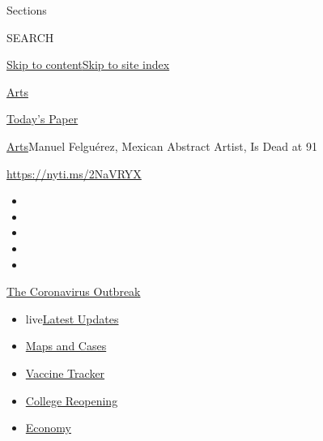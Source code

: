 Sections

SEARCH

\protect\hyperlink{site-content}{Skip to
content}\protect\hyperlink{site-index}{Skip to site index}

\href{https://www.nytimes.com/section/arts}{Arts}

\href{https://myaccount.nytimes.com/auth/login?response_type=cookie\&client_id=vi}{}

\href{https://www.nytimes.com/section/todayspaper}{Today's Paper}

\href{/section/arts}{Arts}\textbar{}Manuel Felguérez, Mexican Abstract
Artist, Is Dead at 91

\url{https://nyti.ms/2NaVRYX}

\begin{itemize}
\item
\item
\item
\item
\item
\end{itemize}

\href{https://www.nytimes.com/news-event/coronavirus?action=click\&pgtype=Article\&state=default\&region=TOP_BANNER\&context=storylines_menu}{The
Coronavirus Outbreak}

\begin{itemize}
\tightlist
\item
  live\href{https://www.nytimes.com/2020/08/03/world/coronavirus-covid-19.html?action=click\&pgtype=Article\&state=default\&region=TOP_BANNER\&context=storylines_menu}{Latest
  Updates}
\item
  \href{https://www.nytimes.com/interactive/2020/us/coronavirus-us-cases.html?action=click\&pgtype=Article\&state=default\&region=TOP_BANNER\&context=storylines_menu}{Maps
  and Cases}
\item
  \href{https://www.nytimes.com/interactive/2020/science/coronavirus-vaccine-tracker.html?action=click\&pgtype=Article\&state=default\&region=TOP_BANNER\&context=storylines_menu}{Vaccine
  Tracker}
\item
  \href{https://www.nytimes.com/2020/08/02/us/covid-college-reopening.html?action=click\&pgtype=Article\&state=default\&region=TOP_BANNER\&context=storylines_menu}{College
  Reopening}
\item
  \href{https://www.nytimes.com/live/2020/08/03/business/stock-market-today-coronavirus?action=click\&pgtype=Article\&state=default\&region=TOP_BANNER\&context=storylines_menu}{Economy}
\end{itemize}

